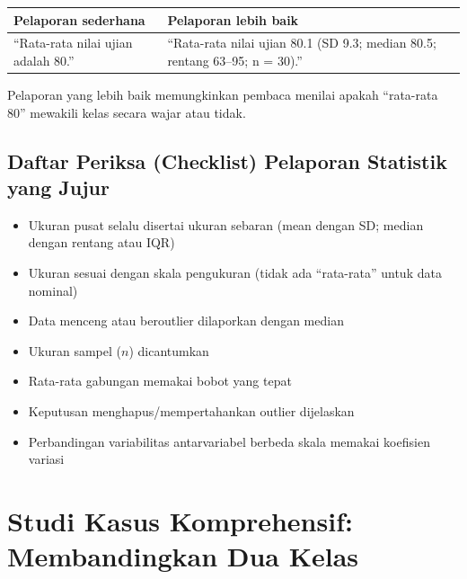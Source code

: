 \documentclass[
  indonesian,
  letterpaper,
]{book}
\newcounter{none} %
\providecommand{\tightlist}{%
  \setlength{\itemsep}{0pt}\setlength{\parskip}{0pt}}
\begin{document}
{\def\LTcaptype{none} %
\begin{longtable}[]{@{}
  >{\raggedright\arraybackslash}p{}
  >{\raggedright\arraybackslash}p{}@{}}
\toprule\noalign{}
\begin{minipage}[b]{\linewidth}\raggedright
Pelaporan sederhana
\end{minipage} & \begin{minipage}[b]{\linewidth}\raggedright
Pelaporan lebih baik
\end{minipage} \\
\midrule\noalign{}
\endhead
\bottomrule\noalign{}
\endlastfoot
``Rata-rata nilai ujian adalah 80.'' & ``Rata-rata nilai ujian 80.1 (SD
9.3; median 80.5; rentang 63--95; n = 30).'' \\
\end{longtable}
}

Pelaporan yang lebih baik memungkinkan pembaca menilai apakah
``rata-rata 80'' mewakili kelas secara wajar atau tidak.

\subsection{Daftar Periksa (Checklist) Pelaporan Statistik yang
Jujur}\label{daftar-periksa-checklist-pelaporan-statistik-yang-jujur}

\begin{itemize}
\tightlist
\item[$\square$]
  Ukuran pusat selalu disertai ukuran sebaran (mean dengan SD; median
  dengan rentang atau IQR)
\item[$\square$]
  Ukuran sesuai dengan skala pengukuran (tidak ada ``rata-rata'' untuk
  data nominal)
\item[$\square$]
  Data menceng atau beroutlier dilaporkan dengan median
\item[$\square$]
  Ukuran sampel (\(n\)) dicantumkan
\item[$\square$]
  Rata-rata gabungan memakai bobot yang tepat
\item[$\square$]
  Keputusan menghapus/mempertahankan outlier dijelaskan
\item[$\square$]
  Perbandingan variabilitas antarvariabel berbeda skala memakai
  koefisien variasi
\end{itemize}

\section{Studi Kasus Komprehensif: Membandingkan Dua
Kelas}\label{studi-kasus-komprehensif-membandingkan-dua-kelas}
\end{document}
